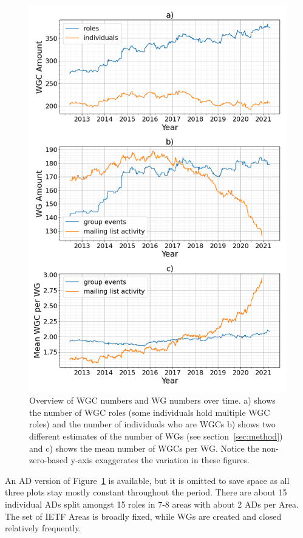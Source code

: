 \documentclass[twocolumn,10pt]{article}
\newlength{\figureWidthOneColumn}
\begin{document}
\begin{figure}[t]
  \centering
  \includegraphics[width=\figureWidthOneColumn]{figures-prev/icwsm-2024/over_time.png}
  \caption{
    Overview of WGC numbers and WG numbers over time. a) shows the number
    of WGC roles (some individuals hold multiple WGC roles) and the number
    of individuals who are WGCs b) shows two different estimates of the
    number of WGs (see section~\ref{sec:method}) and c) shows the mean
    number of WGCs per WG. Notice the non-zero-based y-axis exaggerates the
    variation in these figures.
  }
  \label{fig:wgc_over_time}
\end{figure}

An AD version of Figure~\ref{fig:wgc_over_time} is available, but it is
omitted to save space as all three plots stay mostly constant throughout
the period. There are about 15 individual ADs split amongst 15 roles in 7-8
areas with about 2 ADs per Area. The set of IETF Areas is broadly fixed,
while WGs are created and closed relatively frequently.
\end{document}
